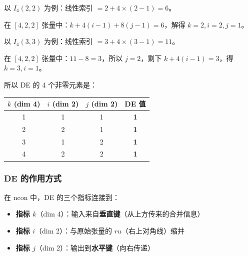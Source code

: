 \documentclass[12pt,a4paper]{article}
\begin{document}
\begin{exbox}[验证线性索引]
以 $I_4(2,2)$ 为例：线性索引 $= 2 + 4 \times (2-1) = 6$。

在 $[4,2,2]$ 张量中：$k + 4(i-1) + 8(j-1) = 6$，解得 $k=2, i=2, j=1$。\checkmark

以 $I_4(3,3)$ 为例：线性索引 $= 3 + 4 \times (3-1) = 11$。

在 $[4,2,2]$ 张量中：$11 - 8 = 3$，所以 $j=2$，剩下 $k + 4(i-1) = 3$，得 $k=3, i=1$。\checkmark
\end{exbox}

所以 DE 的 4 个非零元素是：

\begin{center}
\begin{tabular}{ccc|c}
\toprule
$k$ (dim 4) & $i$ (dim 2) & $j$ (dim 2) & DE 值 \\
\midrule
1 & 1 & 1 & \textbf{1} \\
2 & 2 & 1 & \textbf{1} \\
3 & 1 & 2 & \textbf{1} \\
4 & 2 & 2 & \textbf{1} \\
\bottomrule
\end{tabular}
\end{center}

\subsubsection{DE 的作用方式}

在 ncon 中，DE 的三个指标连接到：
\begin{itemize}
  \item \textbf{指标 $k$}（dim 4）：输入来自\textbf{垂直键}（从上方传来的合并信息）
  \item \textbf{指标 $i$}（dim 2）：与原始张量的 $ru$（右上对角线）缩并
  \item \textbf{指标 $j$}（dim 2）：输出到\textbf{水平键}（向右传递）
\end{itemize}

\begin{center}
\end{center}
\end{document}
